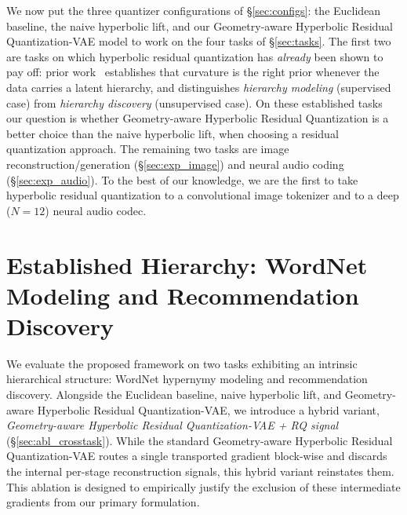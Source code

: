 \documentclass[12pt]{report}
\begin{document}
We now put the three quantizer configurations of \S\ref{sec:configs}: the Euclidean baseline, the naive hyperbolic lift, and our Geometry-aware Hyperbolic Residual Quantization-VAE model to work on the four tasks of \S\ref{sec:tasks}. The first two are tasks on which hyperbolic residual quantization has \emph{already} been shown to pay off: prior work~\cite{hrqvae} establishes that curvature is the right prior whenever the data carries a latent hierarchy, and distinguishes \emph{hierarchy modeling} (supervised case) from \emph{hierarchy discovery} (unsupervised case). On these established tasks our question is whether Geometry-aware Hyperbolic Residual Quantization is a better choice than the naive hyperbolic lift, when choosing a residual quantization approach. The remaining two tasks are image reconstruction/generation (\S\ref{sec:exp_image}) and neural audio coding (\S\ref{sec:exp_audio}). To the best of our knowledge, we are the first to take hyperbolic residual quantization to a convolutional image tokenizer and to a deep ($N=12$) neural audio codec.

\section{Established Hierarchy: WordNet Modeling and Recommendation Discovery}
\label{sec:exp_nlp}
\label{sec:exp_rec}

We evaluate the proposed framework on two tasks exhibiting an intrinsic hierarchical structure: WordNet hypernymy modeling and recommendation discovery. Alongside the Euclidean baseline, naive hyperbolic lift, and Geometry-aware Hyperbolic Residual Quantization-VAE, we introduce a hybrid variant, \emph{Geometry-aware Hyperbolic Residual Quantization-VAE + RQ signal} (\S\ref{sec:abl_crosstask}). While the standard Geometry-aware Hyperbolic Residual Quantization-VAE routes a single transported gradient block-wise and discards the internal per-stage reconstruction signals, this hybrid variant reinstates them. This ablation is designed to empirically justify the exclusion of these intermediate gradients from our primary formulation.
\end{document}
